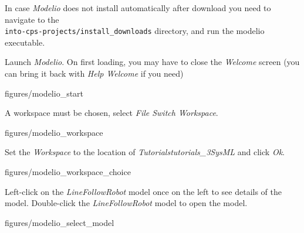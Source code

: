 \documentclass[11pt,a4paper]{../tutorial}
\begin{document}
\begin{instructions}

\item In case \emph{Modelio} does not install automatically after download you need to navigate to the \\	\texttt{into-cps-projects/install\_downloads} directory, and run the modelio executable.

\item Launch \emph{Modelio}. On first loading, you may have to close the \emph{Welcome} screen (you can bring it back with \emph{Help \menusep Welcome} if you need)

\begin{annotation}[width=1\linewidth,trim=0 400 0 0,clip]{figures/modelio_start}
    \end{annotation}

\item A workspace must be chosen, select \emph{File \menusep Switch Workspace}.

\begin{annotation}[width=1\linewidth,trim=0 700 0 0,clip]{figures/modelio_workspace}
    \end{annotation}
\newpage

\item Set the \emph{Workspace} to the location of \emph{Tutorials\pathsep{}tutorials\_3\pathsep{}SysML} and click \emph{Ok}.

\begin{annotation}[width=0.5\linewidth,trim=0 0 0 0,clip]{figures/modelio_workspace_choice}
    \end{annotation}

\item Left-click on the \emph{LineFollowRobot} model once on the left to see details of the model. Double-click the \emph{LineFollowRobot} model to open the model.

    \begin{annotation}[width=1\linewidth,trim=0 300 0 0,clip]{figures/modelio_select_model}
    \end{annotation}


\end{instructions}
\end{document}
